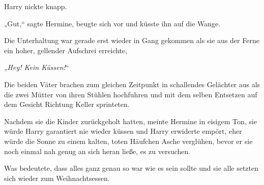 Harry nickte knapp.

„Gut,“ sagte Hermine, beugte sich vor und küsste ihn auf die Wange.

\later

Die Unterhaltung war gerade erst wieder in Gang gekommen als sie aus der Ferne ein hoher, gellender Aufschrei erreichte,

„\emph{Hey! Kein Küssen!}“

Die beiden Väter brachen zum gleichen Zeitpunkt in schallendes Gelächter aus als die zwei Mütter von ihren Stühlen hochfuhren und mit dem selben Entsetzen auf dem Gesicht Richtung Keller sprinteten.

Nachdem sie die Kinder zurückgeholt hatten, meinte Hermine in eisigem Ton, sie würde Harry garantiert nie wieder küssen und Harry erwiderte empört, eher würde die Sonne zu einem kalten, toten Häufchen Asche verglühen, bevor er sie noch einmal nah genug an sich heran ließe, es zu versuchen.

Was bedeutete, dass alles ganz genau so war wie es sein sollte und sie alle setzten sich wieder zum Weihnachtsessen.

